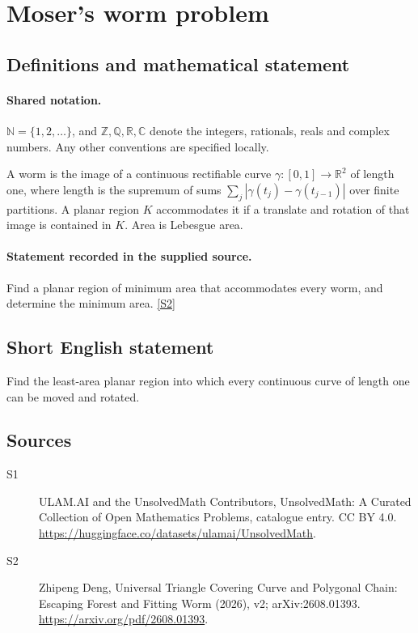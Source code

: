 \documentclass[11pt]{article}
\newcommand{\sref}[2]{\hyperlink{source:#1:#2}{[S#2]}}
\begin{document}
\section{Moser's worm problem}\label{statement}

\subsection{Definitions and mathematical statement}

\paragraph{Shared notation.}$\mathbb N=\{1,2,\ldots\}$, and $\mathbb Z,\mathbb Q,\mathbb R,\mathbb C$ denote the integers, rationals, reals and complex numbers. Any other conventions are specified locally.


A worm is the image of a continuous rectifiable curve $\gamma:[0,1]\to\mathbb R^2$ of length one, where length is the supremum of sums $\sum_j|\gamma(t_j)-\gamma(t_{j-1})|$ over finite partitions. A planar region $K$ accommodates it if a translate and rotation of that image is contained in $K$. Area is Lebesgue area.
\paragraph{Statement recorded in the supplied source.}
Find a planar region of minimum area that accommodates every worm, and determine the minimum area. \sref{statement}{2}
\subsection{Short English statement}
Find the least-area planar region into which every continuous curve of length one can be moved and rotated.
\subsection{Sources}
\begin{description}
\item[\hypertarget{source:statement:1}{S1}] ULAM.AI and the UnsolvedMath Contributors, UnsolvedMath: A Curated Collection of Open Mathematics Problems, catalogue entry. CC BY 4.0. \url{https://huggingface.co/datasets/ulamai/UnsolvedMath}.
\item[\hypertarget{source:statement:2}{S2}] Zhipeng Deng, Universal Triangle Covering Curve and Polygonal Chain: Escaping Forest and Fitting Worm (2026), v2; arXiv:2608.01393. \url{https://arxiv.org/pdf/2608.01393}.
\end{description}
\label{end:statement}
\end{document}
